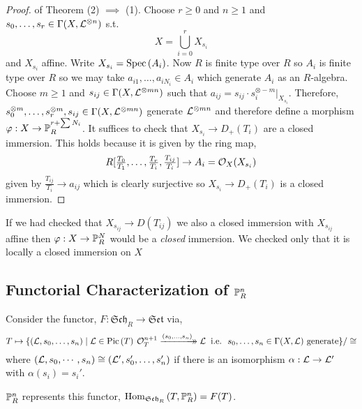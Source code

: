 \documentclass[12pt]{article}
\begin{document}
\begin{proof}
of Theorem (2) $\implies$ (1). Choose $r \ge 0$ and $n \ge 1$ and $s_0, \dots, s_r \in \Gamma(X, \L^{\otimes n})$ s.t.
\[ X = \bigcup_{i = 0}^r X_{s_i} \]
and $X_{s_i}$ affine. Write $X_{s_i} = \Spec{A_i}$. Now $R$ is finite type over $R$ so $A_i$ is finite type over $R$ so we may take $a_{i1}, \dots, a_{i N_i} \in A_i$ which generate $A_i$ as an $R$-algebra. Choose $m \ge 1$ and $s_{ij} \in \Gamma(X, \L^{\otimes mn})$ such that $a_{ij} = s_{ij} \cdot s_i^{\otimes -m} |_{X_{s_i}}$. Therefore, $s_0^{\otimes m}, \dots, s_r^{\otimes m}, s_{ij} \in \Gamma(X, \L^{\otimes mn})$ generate $\L^{\otimes mn}$ and therefore define a morphism $\varphi : X \to \P_R^{r + \sum N_i}$. It suffices to check that $X_{s_i} \to D_{+}(T_i)$ are a closed immersion. This holds because it is given by the ring map,
\[ R[ \tfrac{T_0}{T_1}, \dots, \tfrac{T_r}{T_i}, \tfrac{T_{ij}}{T_i} ] \to A_i = \struct{X}(X_{s_i})  \]
given by $\frac{T_{ij}}{T_i} \to a_{ij}$ which is clearly surjective so $X_{s_i} \to D_+(T_i)$ is a closed immersion.
\end{proof}

\begin{rmk}
If we had checked that $X_{s_{ij}} \to D(T_{ij})$ we also a closed immersion with $X_{s_{ij}}$ affine then $\varphi : X \to \P^N_R$ would be a \textit{closed} immersion. We checked only that it is locally a closed immersion on $X$
\end{rmk}

\subsection{Functorial Characterization of $\P^n_R$}

\renewcommand{\Sch}{\mathfrak{Sch}}
\newcommand{\Set}{\mathfrak{Set}}

\newcommand{\rightarrowdbl}{\rightarrow\mathrel{\mkern-14mu}\rightarrow}

\newcommand{\xrightarrowdbl}[2][]{%
  \xrightarrow[#1]{#2}\mathrel{\mkern-14mu}\rightarrow
}

Consider the functor, $F : \Sch_R \to \Set$ via,
\[ T \mapsto \{ (\L, s_0, \dots, s_n) \mid \L \in \Pic{T} \: \struct{T}^{n+1} \xrightarrowdbl{(s_0, \dots, s_n)} \L \: \text{ i.e. } \: s_0, \dots, s_n \in \Gamma(X, \L) \text{ generate} \} / \cong \]
where $(\L, s_0, \cdots, s_n) \cong (\L', s_0', \dots, s_n')$ if there is an isomorphism $\alpha : \L \to \L'$ with $\alpha(s_i) = s_i'$. 

\begin{theorem}
$\P^n_R$ represents this functor, $\Hom{\Sch_R}{T}{\P^n_R} = F(T)$. 
\end{theorem}
\end{document}
